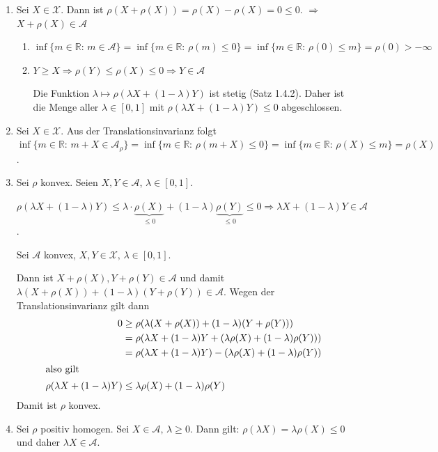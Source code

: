 \documentclass[a4paper,twoside,DIV15,BCOR12mm]{scrbook}
\begin{document}
\begin{beweis}

\begin{enumerate}
\item Sei $X\in\mathcal{X}$. Dann ist $\rho(X+\rho(X))=\rho(X)-\rho(X)=0\leq 0$. $\Rightarrow$ $X+\rho(X)\in\mathcal{A}$

\begin{enumerate}
\item $\inf\{m\in\mathbb{R}:\, m\in\mathcal{A}\}=\inf\{m\in\mathbb{R}:\, \rho(m)\leq 0\}=\inf\{m\in\mathbb{R}:\, \rho(0)\leq m\}=\rho(0)>-\infty$
\item $Y\geq X \Rightarrow \rho(Y)\leq \rho(X) \leq 0 \Rightarrow Y\in\mathcal{A}$

Die Funktion $\lambda\mapsto \rho(\lambda X+(1-\lambda)Y)$ ist stetig (Satz 1.4.2). Daher ist die Menge aller $\lambda\in[0, 1]$ mit $\rho(\lambda X+(1-\lambda) Y)\leq 0$ abgeschlossen.
\end{enumerate}

\item Sei $X\in\mathcal{X}$. Aus der Translationsinvarianz folgt $\inf\{m\in\mathbb{R}:\, m+X\in\mathcal{A}_\rho\}=\inf\{m\in\mathbb{R}:\, \rho(m+X)\leq 0\}=\inf\{ m\in\mathbb{R}:\, \rho(X)\leq m\}=\rho(X)$.

\item Sei $\rho$ konvex. Seien $X,Y\in\mathcal{A}$, $\lambda\in[0, 1]$.

$\rho(\lambda X+(1-\lambda) Y)\leq \lambda\cdot \underbrace{\rho(X)}_{\leq 0}+ (1-\lambda) \underbrace{\rho(Y)}_{\leq 0}\leq 0 \Rightarrow \lambda X+(1-\lambda) Y \in\mathcal{A}$.

Sei $\mathcal{A}$ konvex, $X,Y\in\mathcal{X},\, \lambda\in[0, 1]$.

Dann ist $X+\rho(X),Y+\rho(Y)\in\mathcal{A}$ und damit
$\lambda(X+\rho(X))+(1-\lambda)(Y+\rho(Y))\in\mathcal{A}$. Wegen der Translationsinvarianz gilt dann
\begin{align*}
0 &\geq\rho(\lambda(X+\rho(X))+(1-\lambda)(Y+\rho(Y))) \\
&=\rho(\lambda X+(1-\lambda)Y+(\lambda \rho(X)+(1-\lambda) \rho(Y))) \\
&=\rho(\lambda X+(1-\lambda)Y)-(\lambda \rho(X)+(1-\lambda)\rho(Y)) \\
\intertext{also gilt}
\rho(\lambda X+(1-\lambda)Y)&\leq \lambda \rho(X)+(1-\lambda)\rho(Y)
\end{align*}
Damit ist $\rho$ konvex.

\item Sei $\rho$ positiv homogen. Sei $X\in\mathcal{A},\, \lambda\geq 0$. Dann gilt: $\rho(\lambda X)=\lambda \rho(X)\leq 0$ und daher $\lambda X\in\mathcal{A}$.


\end{enumerate}
\end{beweis}
\end{document}
